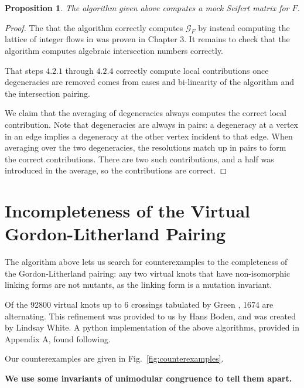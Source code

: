 \documentclass[12pt]{report}
\newcommand{\notered}[1]{{\color{Red} \textbf{#1}}}
\newtheorem*{proposition}{Proposition}
\theoremstyle{upright}
\begin{document}
\begin{proposition}
The algorithm given above computes a mock Seifert matrix for $F$.
\end{proposition}

\begin{proof}
The that the algorithm correctly computes $\mathcal{G}_{F}$ by instead computing the lattice of integer flows in was proven in Chapter 3. It remains to check that the algorithm computes algebraic intersection numbers correctly.

That steps $4.2.1$ through $4.2.4$ correctly compute local contributions once degeneracies are removed comes from cases and bi-linearity of the algorithm and the intersection pairing.

We claim that the averaging of degeneracies always computes the correct local contribution. Note that degeneracies are always in pairs: a degeneracy at a vertex in an edge implies a degeneracy at the other vertex incident to that edge. When averaging over the two degeneracies, the resolutions match up in pairs to form the correct contributions. There are two such contributions, and a half was introduced in the average, so the contributions are correct.
\end{proof}

\section{Incompleteness of the Virtual Gordon-Litherland Pairing}

The algorithm above lets us search for counterexamples to the completeness of the Gordon-Litherland pairing: any two virtual knots that have non-isomorphic linking forms are not mutants, as the linking form is a mutation invariant.

Of the 92800 virtual knots up to 6 crossings tabulated by Green \cite{virtual-knot-table}, 1674 are alternating. This refinement was provided to us by Hans Boden, and was created by Lindsay White. A python implementation of the above algorithms, provided in Appendix A, found following.

Our counterexamples are given in Fig.~\ref{fig:counterexamples}.

\notered{We use some invariants of unimodular congruence to tell them apart.}
\end{document}
